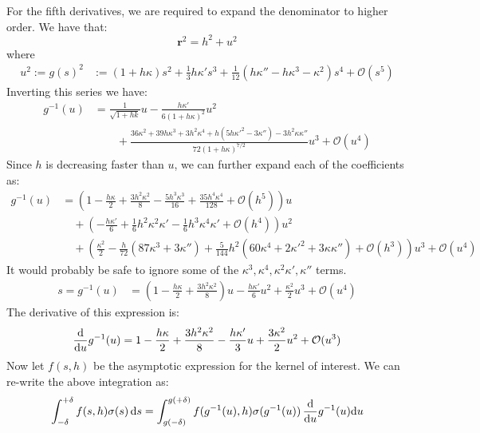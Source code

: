 \documentclass[preprint,12pt,3p]{elsarticle}
\newcommand{\dd}{ {\rm d} }
\begin{document}
For the fifth derivatives, we are required to expand the denominator to higher order. We have that:
\begin{equation}
    \pmb{r}^2 = h^2 + u^2
\end{equation}
where 
\begin{align}
    u^2 := g(s)^2 &:= (1+h\kappa)s^2 + \frac{1}{3} h \kappa' s^3 + \frac{1}{12} (h \kappa'' - h\kappa^3 - \kappa^2)s^4    + \mathcal{O}(s^5) \label{udefinition}
\end{align}
Inverting this series we have:
\begin{align}
   g^{-1}(u) &= \frac{1}{\sqrt{1 + hk}} u  - \frac{h \kappa'}{6 (1+h\kappa)^2}u^2 \nonumber \\
    &\qquad + \frac{36 \kappa^2 + 39 h \kappa^3 + 3 h^2 \kappa^4  + h (5 h \kappa'^2 - 3 \kappa'') - 3 h^2 \kappa \kappa''}{72 (1+h\kappa)^{7/2}} u^3 + \mathcal{O}(u^4)
\end{align}
Since $h$ is decreasing faster than $u$, we can further expand each of the coefficients as:
\begin{align}
    g^{-1}(u) &= \left( 1 - \frac{h\kappa}{2}+ \frac{3 h^2 \kappa^2}{8} - \frac{5 h^3 \kappa^3}{16} + \frac{35 h^4 \kappa^4}{128} + \mathcal{O}(h^5) \right) u \nonumber \\
    &\quad + \left( -\frac{h \kappa'}{6} + \frac{1}{6} h^2 \kappa^2 \kappa' - \frac16  h^3  \kappa^4  \kappa' + \mathcal{O}(h^4) \right) u^2 \nonumber \\
    &\quad +  \left( \frac{\kappa^2}{2} - \frac{h}{72}  (87 \kappa^3 + 3 \kappa'') + 
 \frac{5}{144} h^2 (60 \kappa^4 + 2 \kappa'^2 + 3  \kappa  \kappa'') + \mathcal{O}(h^3) \right) u^3 + \mathcal{O}(u^4)
\end{align}
It would probably be safe to ignore some of the $\kappa^3, \kappa^4, \kappa^2 \kappa', \kappa''$ terms.
\begin{align}
    s = g^{-1}(u) &= \left( 1 - \frac{h\kappa}{2}+ \frac{3 h^2 \kappa^2}{8}  \right) u  -\frac{h \kappa'}{6}   u^2  +  \frac{\kappa^2}{2} u^3 + \mathcal{O}(u^4)
\end{align}
The derivative of this expression is:
\begin{align}
    \frac{\dd}{\dd u} g^{-1}(u) =  1 - \frac{h\kappa}{2}+ \frac{3 h^2 \kappa^2}{8}    - \frac{h \kappa'}{3}   u  +  \frac{3 \kappa^2}{2} u^2 +\mathcal{O}(u^3)
\end{align}
Now let $f(s,h)$ be the asymptotic expression for the kernel of interest. We can re-write the above integration as:
\begin{align}
    \int_{-\delta}^{+\delta} f(s,h) \sigma(s) \, \dd s = \int_{g(-\delta)}^{g(+\delta)} f(g^{-1}(u),h) \sigma(g^{-1}(u)) \, \frac{\dd }{\dd u} g^{-1}(u) \dd u
\end{align}
\end{document}
